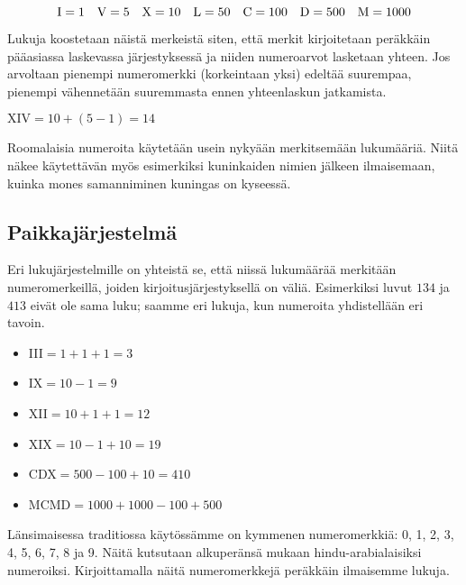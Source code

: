 \begin{equation*}
\rm I=1\quad
V=5\quad
X=10\quad
L=50\quad
C=100\quad
D=500\quad
M=1 000
\end{equation*}


Lukuja koostetaan näistä merkeistä siten, että merkit kirjoitetaan peräkkäin pääasiassa laskevassa järjestyksessä ja niiden numeroarvot lasketaan yhteen. Jos arvoltaan pienempi numeromerkki (korkeintaan yksi) edeltää suurempaa, pienempi vähennetään suuremmasta ennen yhteenlaskun jatkamista.

\begin{esimerkki}
$\text{XIV} = 10 + (5 - 1) = 14$
\end{esimerkki}

Roomalaisia numeroita käytetään usein nykyään merkitsemään lukumääriä. Niitä näkee käytettävän myös esimerkiksi kuninkaiden nimien jälkeen ilmaisemaan, kuinka mones samanniminen kuningas on kyseessä.

\subsection*{Paikkajärjestelmä}

Eri lukujärjestelmille on yhteistä se, että niissä lukumäärää merkitään numeromerkeillä, joiden kirjoitusjärjestyksellä on väliä. Esimerkiksi luvut $134$ ja $413$ eivät ole sama luku; saamme eri lukuja, kun numeroita yhdistellään eri tavoin.

\begin{esimerkki}
\begin{itemize}
\item III$=1+1+1=3$
\item IX$=10-1=9$
\item XII$=10+1+1=12$
\item XIX$=10-1+10=19$
\item CDX$=500-100+10=410$
\item MCMD$=1 000+1 000-100+500$
\end{itemize}
\end{esimerkki}

Länsimaisessa traditiossa käytössämme on kymmenen numeromerkkiä: 0, 1, 2, 3, 4, 5, 6, 7, 8 ja 9. Näitä kutsutaan alkuperänsä mukaan hindu-arabialaisiksi numeroiksi. Kirjoittamalla näitä numeromerkkejä peräkkäin ilmaisemme lukuja.

